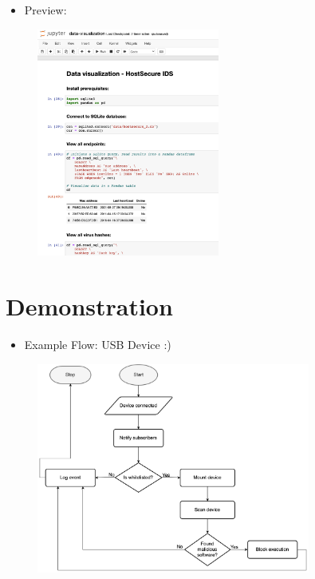 \begin{frame}{\insertsubsection}
    \begin{itemize}
        \item Preview:
    \end{itemize}
    
    \begin{figure}[h]
        \centering
        \includegraphics[width=6cm]{img/jupyter.png}
        \label{fig:db_erdiagram}
    \end{figure}
\end{frame}


\section{Demonstration}
\begin{frame}{\insertsection}
    \begin{itemize}
        \item Example Flow: USB Device :)
    \end{itemize}
      \begin{figure}[h]
        \centering
        \includegraphics[width=9cm]{img/flow_pp.png}
        \label{fig:example_flow}
    \end{figure}
\end{frame}

